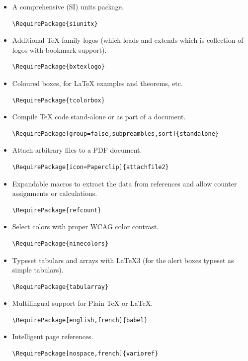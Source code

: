 \documentclass{letgut}
\begin{document}
\begin{itemize}
\item A comprehensive (SI) units package.
\begin{lstlisting}
\RequirePackage{siunitx}
\end{lstlisting}
\item Additional \TeX{}-family logos (which loads and extends  which is
collection of logos with bookmark support).
\begin{lstlisting}
\RequirePackage{bxtexlogo}
\end{lstlisting}
\item Coloured boxes, for \LaTeX{} examples and theorems, etc.
\begin{lstlisting}
\RequirePackage{tcolorbox}
\end{lstlisting}
\item Compile \TeX{} code stand-alone or as part of a document.
\begin{lstlisting}
\RequirePackage[group=false,subpreambles,sort]{standalone}
\end{lstlisting}
\item Attach arbitrary files to a PDF document.
\begin{lstlisting}
\RequirePackage[icon=Paperclip]{attachfile2}
\end{lstlisting}
\item Expandable macros to extract the data from references and allow counter
assignments or calculations.
\begin{lstlisting}
\RequirePackage{refcount}
\end{lstlisting}
\item Select colors with proper WCAG color contrast.
\begin{lstlisting}
\RequirePackage{ninecolors}
\end{lstlisting}
\item Typeset tabulars and arrays with LaTeX3 (for the alert boxes typeset as
simple tabulars).
\begin{lstlisting}
\RequirePackage{tabularray}
\end{lstlisting}
\item Multilingual support for Plain \TeX{} or \LaTeX{}.
\begin{lstlisting}
\RequirePackage[english,french]{babel}
\end{lstlisting}
\item Intelligent page references.
\begin{lstlisting}
\RequirePackage[nospace,french]{varioref}

\end{lstlisting}
\end{itemize}
\end{document}

